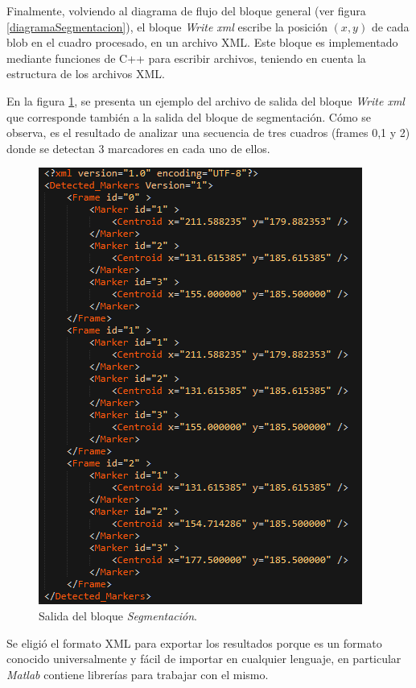 \vspace{10 mm}
Finalmente, volviendo al diagrama de flujo del bloque general (ver figura \ref{diagramaSegmentacion}), el bloque \emph{Write xml} escribe la posición $(x,y)$ de cada blob en el cuadro procesado, en un archivo XML\cite{xml}. Este bloque es implementado mediante funciones de C++ para escribir archivos, teniendo en cuenta la estructura de los archivos XML\cite{xml}.

En la figura \ref{salidaxml}, se presenta un ejemplo del archivo de salida del bloque \emph{Write xml} que corresponde también a la salida del bloque de segmentación. Cómo se observa, es el resultado de analizar una secuencia de tres cuadros (frames 0,1 y 2) donde se detectan 3 marcadores en cada uno de ellos.

\begin{figure}[H]
\begin{center}
\includegraphics[scale=0.9]{img/salidaXml.png}
\end{center}
\caption{Salida del bloque \emph{Segmentación}.}
\label{salidaxml}
\end{figure}


 Se eligió el formato XML\cite{xml} para exportar los resultados porque es un formato conocido universalmente y fácil de importar en cualquier lenguaje, en particular \emph{Matlab} contiene librerías para trabajar con el mismo.

